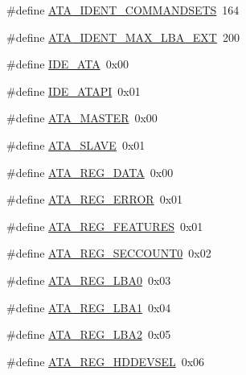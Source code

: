 \begin{DoxyCompactItemize}
\item 
\#define \hyperlink{a00032_a8536e132f24aa36e826f753b6061e8ea_a8536e132f24aa36e826f753b6061e8ea}{A\+T\+A\+\_\+\+I\+D\+E\+N\+T\+\_\+\+C\+O\+M\+M\+A\+N\+D\+S\+E\+TS}~164
\item 
\#define \hyperlink{a00032_aa1926c13a31f512c9ec07ed3bdba8893_aa1926c13a31f512c9ec07ed3bdba8893}{A\+T\+A\+\_\+\+I\+D\+E\+N\+T\+\_\+\+M\+A\+X\+\_\+\+L\+B\+A\+\_\+\+E\+XT}~200
\item 
\#define \hyperlink{a00032_a3046279f2a25227c121b69f4cf855bf8_a3046279f2a25227c121b69f4cf855bf8}{I\+D\+E\+\_\+\+A\+TA}~0x00
\item 
\#define \hyperlink{a00032_a6513ee2a4da2c6aaa691b9d4c639a53e_a6513ee2a4da2c6aaa691b9d4c639a53e}{I\+D\+E\+\_\+\+A\+T\+A\+PI}~0x01
\item 
\#define \hyperlink{a00032_acb5691a26e836afc6972577bd71b0d97_acb5691a26e836afc6972577bd71b0d97}{A\+T\+A\+\_\+\+M\+A\+S\+T\+ER}~0x00
\item 
\#define \hyperlink{a00032_abe2ab9064f7100c5915bc694386a3e40_abe2ab9064f7100c5915bc694386a3e40}{A\+T\+A\+\_\+\+S\+L\+A\+VE}~0x01
\item 
\#define \hyperlink{a00032_a359c566cefff5e671eb3bae72e0d0948_a359c566cefff5e671eb3bae72e0d0948}{A\+T\+A\+\_\+\+R\+E\+G\+\_\+\+D\+A\+TA}~0x00
\item 
\#define \hyperlink{a00032_ad2f2744a08145beb17b7ed6ca0465d85_ad2f2744a08145beb17b7ed6ca0465d85}{A\+T\+A\+\_\+\+R\+E\+G\+\_\+\+E\+R\+R\+OR}~0x01
\item 
\#define \hyperlink{a00032_aa2dc5ed9bf4786f687e4000243f6a21d_aa2dc5ed9bf4786f687e4000243f6a21d}{A\+T\+A\+\_\+\+R\+E\+G\+\_\+\+F\+E\+A\+T\+U\+R\+ES}~0x01
\item 
\#define \hyperlink{a00032_ad995693d31857a8e514b5f96c5fc4cdb_ad995693d31857a8e514b5f96c5fc4cdb}{A\+T\+A\+\_\+\+R\+E\+G\+\_\+\+S\+E\+C\+C\+O\+U\+N\+T0}~0x02
\item 
\#define \hyperlink{a00032_a9818e533e211e2ddadf650dab77f55fd_a9818e533e211e2ddadf650dab77f55fd}{A\+T\+A\+\_\+\+R\+E\+G\+\_\+\+L\+B\+A0}~0x03
\item 
\#define \hyperlink{a00032_a4ca55ad2c56ea915f9dcde1aba57433d_a4ca55ad2c56ea915f9dcde1aba57433d}{A\+T\+A\+\_\+\+R\+E\+G\+\_\+\+L\+B\+A1}~0x04
\item 
\#define \hyperlink{a00032_afaf134917cbfc81c86b4e1d67930757a_afaf134917cbfc81c86b4e1d67930757a}{A\+T\+A\+\_\+\+R\+E\+G\+\_\+\+L\+B\+A2}~0x05
\item 
\#define \hyperlink{a00032_af80b9f0d852148eda227b433f72ca8bb_af80b9f0d852148eda227b433f72ca8bb}{A\+T\+A\+\_\+\+R\+E\+G\+\_\+\+H\+D\+D\+E\+V\+S\+EL}~0x06

\end{DoxyCompactItemize}
